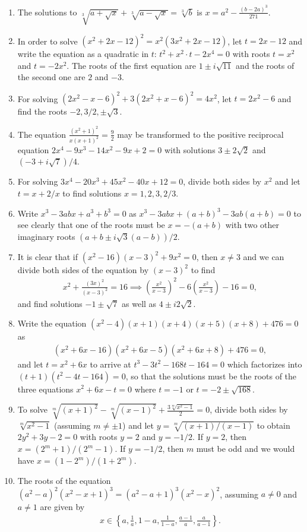 \begin{solution}
\begin{enumerate}
        \item The solutions to $\sqrt[3]{a+\sqrt x} + \sqrt[3]{a-\sqrt x} =\sqrt[3]{b}$ is $x=a^2-\displaystyle\frac{(b-2a)^3}{271}$.
        \item In order to solve $(x^2+2x-12)^2=x^2(3x^2+2x-12)$, let $t=2x-12$ and write the equation as a quadratic in $t$: $t^2 + x^2 \cdot t - 2x^4 =0$ with roots $t=x^2$ and $t=-2x^2$. The roots of the first equation are $1\pm i\sqrt{11}$ and the roots of the second one are $2$ and $-3$.
        \item For solving $(2x^2-x-6)^2+3(2x^2+x-6)^2=4x^2$, let $t=2x^2-6$ and find the roots $-2, 3/2, \pm \sqrt 3$.
        \item The equation $\displaystyle \frac{(x^2+1)^2}{x(x+1)^2} = \frac{9}{2}$ may be transformed to the positive reciprocal equation $2x^4-9x^3-14x^2-9x+2=0$ with solutions $3\pm 2\sqrt 2$ and $(-3+i\sqrt 7)/4$.
        \item For solving $3x^4-20x^3+45x^2-40x+12=0$, divide both sides by $x^2$ and let $t=x+2/x$ to find solutions $x=1,2,3,2/3$.
        \item Write $x^3-3abx+a^3+b^3=0$ as $x^3-3abx+(a+b)^3-3ab(a+b)=0$ to see clearly that one of the roots must be $x=-(a+b)$ with two other imaginary roots $(a+b\pm i\sqrt 3 (a-b))/2$.
        \item It is clear that if $(x^2-16)(x-3)^2+9x^2=0$, then $x\neq 3$ and we can divide both sides of the equation by $(x-3)^2$ to find
        \begin{align*}
            x^2+\frac{(3x)^2}{(x-3)^2}=16 \implies \left(\frac{x^2}{x-3}\right)^2 - 6\left(\frac{x^2}{x-3}\right) - 16= 0,
        \end{align*}
        and find solutions $-1\pm \sqrt 7$ as well as $4\pm i2\sqrt 2$.
        \item Write the equation $(x^2-4)(x+1)(x+4)(x+5)(x+8)+476=0$ as 
        \begin{align*}
            (x^2+6x-16)(x^2+6x-5)(x^2+6x+8)+476=0,
        \end{align*}
        and let $t=x^2+6x$ to arrive at $t^3-3t^2-168t-164=0$ which factorizes into $(t+1)(t^2-4t-164)=0$, so that the solutions must be the roots of the three equations $x^2+6x-t=0$ where $t=-1$ or $t=-2\pm\sqrt{168}$.
        \item To solve $\sqrt[m]{(x+1)^2} - \sqrt[m]{(x-1)^2} + \displaystyle \frac{3\sqrt[m]{x^2-1}}{2}=0$, divide both sides by $\sqrt[m]{x^2-1}$ (assuming $m\neq \pm 1$) and let $y= \sqrt[m]{(x+1)/(x-1)}$ to obtain $2y^2+3y-2=0$ with roots $y=2$ and $y=-1/2$. If $y=2$, then $x=(2^m+1)/(2^m-1)$. If $y=-1/2$, then $m$ must be odd and we would have $x=(1-2^m)/(1+2^m)$. 
        \item The roots of the equation $(a^2-a)^2(x^2-x+1)^3 = (a^2-a+1)^3(x^2-x)^2$, assuming $a\neq 0$ and $a\neq 1$ are given by
        \begin{align*}
            x \in \left\{a, \frac{1}{a}, 1-a, \frac{1}{1-a}, \frac{a-1}{a}, \frac{a}{a-1}\right\}.
        \end{align*}
    \end{enumerate}
\end{solution}


